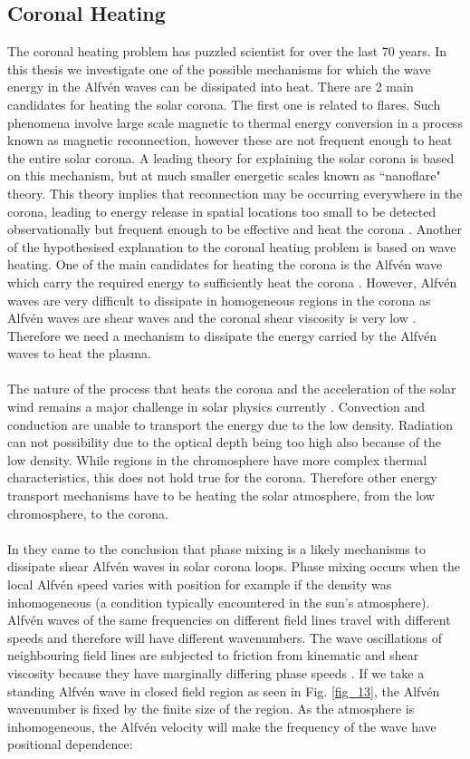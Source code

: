 \documentclass[12pt,a4paper,twoside]{article}
\newcommand{\Alfven}{Alfv\'{e}n }
\begin{document}
\subsection{Coronal Heating} \label{sec1}
The coronal heating problem has puzzled scientist for over the last 70 years. In this thesis we investigate one of the possible mechanisms for which the wave energy in the \Alfven waves can be dissipated into heat. There are 2 main candidates for heating the solar corona. The first one is related to flares. Such phenomena involve large scale magnetic to thermal energy conversion in a process known as magnetic reconnection, however these are not frequent enough to heat the entire solar corona. A leading theory for explaining the solar corona is based on this mechanism, but at much smaller energetic scales known as ``nanoflare" theory. This theory implies that reconnection may be occurring everywhere in the corona, leading to energy release in spatial locations too small to be detected observationally but frequent enough to be effective and heat the corona \citep{Narain_2006JApA}. Another of the hypothesised explanation to the coronal heating problem is based on wave heating. One of the main candidates for heating the corona is the \Alfven wave which carry the required energy to sufficiently heat the corona \citep{Aschwanden_2005_psci}. However, \Alfven waves are very difficult to dissipate in homogeneous regions in the corona as \Alfven waves are shear waves and the coronal shear viscosity is very low \citep{Hollweg_1991_mcch}. Therefore we need a mechanism to dissipate the energy carried by the \Alfven waves to heat the plasma. \\ \\ The nature of the process that heats the corona and the acceleration of the solar wind remains a major challenge in solar physics currently \citep{narayanan2014introduction}. Convection and conduction are unable to transport the energy due to the low density. Radiation can not possibility due to the optical depth being too high also because of the low density. While regions in the chromosphere have more complex thermal characteristics, this does not hold true for the corona. Therefore other energy transport mechanisms have to be heating the solar atmosphere, from the low chromosphere, to the corona.\\ \\ In \cite{Heyvaerts_1983_A} they came to the conclusion that phase mixing is a likely mechanisms to dissipate shear \Alfven waves in solar corona loops. Phase mixing occurs when the local \Alfven speed varies with position for example if the density was inhomogeneous (a condition typically encountered in the sun's atmosphere). \Alfven waves of the same frequencies on different field lines travel with different speeds and therefore will have different wavenumbers. The wave oscillations of neighbouring field lines are subjected to friction from kinematic and shear viscosity because they have marginally differing phase speeds \citep{Aschwanden_2005_psci}. If we take a standing \Alfven wave in closed field region as seen in Fig. \ref{fig_13}, the \Alfven wavenumber is fixed by the finite size of the region. As the atmosphere is inhomogeneous, the \Alfven velocity will make the frequency of the wave have positional dependence:
\end{document}
